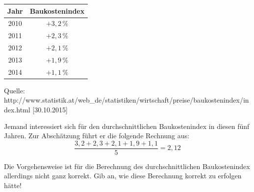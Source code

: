 \begin{langesbeispiel}
\begin{enumerate}
\begin{center}
	\begin{tabular}{|c|c|}\hline
	\cellcolor[gray]{0.9}Jahr&\cellcolor[gray]{0.9}Baukostenindex\\ \hline
	2010&$+3,2\,\%$\\ \hline
	2011&$+2,3\,\%$\\ \hline
	2012&$+2,1\,\%$\\ \hline
	2013&$+1,9\,\%$\\ \hline
	2014&$+1,1\,\%$\\ \hline
	\end{tabular}
\end{center}
\begin{scriptsize} Quelle: http://www.statistik.at/web\_de/statistiken/wirtschaft/preise/baukostenindex/index.html [30.10.2015]\end{scriptsize}

Jemand interessiert sich für den durchschnittlichen Baukostenindex in diesen fünf Jahren. Zur Abschätzung führt er die folgende Rechnung aus:
 $$\frac{3,2+2,3+2,1+1,9+1,1}{5}=2,12$$

Die Vorgehensweise ist für die Berechnung des durchschnittlichen Baukostenindex allerdings nicht ganz korrekt. Gib an, wie diese Berechnung korrekt zu erfolgen hätte!
						\end{enumerate}\leer
				
\end{langesbeispiel}
